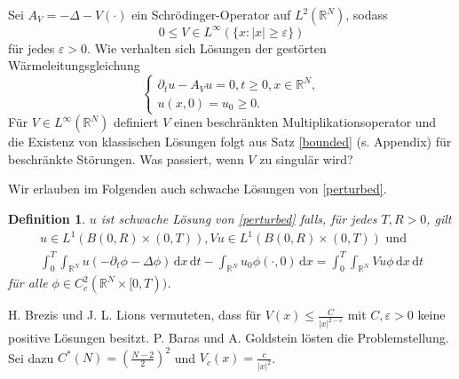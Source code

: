 \documentclass[11pt,twoside,a4paper]{article}
\newtheorem{df}[thm]{Definition}
\theoremstyle{break}
\begin{document}
Sei $A_V= -\Delta - V(\cdot)$ ein Schr\"odinger-Operator auf $L^2(\mathbb R^N)$, sodass
\begin{equation}
0\le V\in L^\infty(\{x:|x|\ge \varepsilon\})
\end{equation}\label{perturbed}
f\"ur jedes $\varepsilon>0$. Wie verhalten sich L\"osungen der gest\"orten W\"armeleitungsgleichung 
\begin{equation}\label{perturbed}
\begin{cases}
\partial_t u - A_V u =0, t\ge 0, x\in \mathbb R^N,\\
u(x,0)=u_0 \ge 0.
\end{cases}
\end{equation}
F\"ur $V\in L^\infty(\mathbb R^N)$ definiert $V$ einen beschr\"ankten Multiplikationsoperator und die Existenz von klassischen L\"osungen folgt aus Satz \ref{bounded} (s. Appendix) f\"ur beschr\"ankte St\"orungen. %
Was passiert, wenn $V$ zu singul\"ar wird?

Wir erlauben im Folgenden auch schwache L\"osungen von \eqref{perturbed}. \vspace{.25cm}
\begin{df}
$u$ ist schwache L\"osung von \eqref{perturbed} falls, f\"ur jedes $T, R>0$, gilt
\begin{gather}\label{weak}
u\in L^1(B(0,R) \times (0,T)), Vu \in L^1(B(0,R)\times (0,T)) \text{ und }\\
\int_0^T \int_{\mathbb R^N} u (-\partial_t \phi - \Delta\phi) \, \mathrm dx \, \mathrm dt - \int_{\mathbb R^N} u_0 \phi(\cdot, 0) \, \mathrm dx = \int_0^T \int_{\mathbb R^N} V u \phi \, \mathrm dx \, \mathrm dt
\end{gather}
f\"ur alle $\phi \in C_c^2(\mathbb R^N\times [0,T))$.
\end{df}

H. Brezis und J. L. Lions vermuteten, dass f\"ur $V(x) \le \frac{C}{|x|^{2-\varepsilon}}$ mit $C, \varepsilon>0$ keine positive L\"osungen besitzt. P. Baras und A. Goldstein l\"osten die Problemstellung.  Sei dazu $C^*(N)=( \tfrac{N-2}{2} )^2$ und $V_c(x) = \frac{c}{|x|^2}$. \vspace{.25cm}
\end{document}
